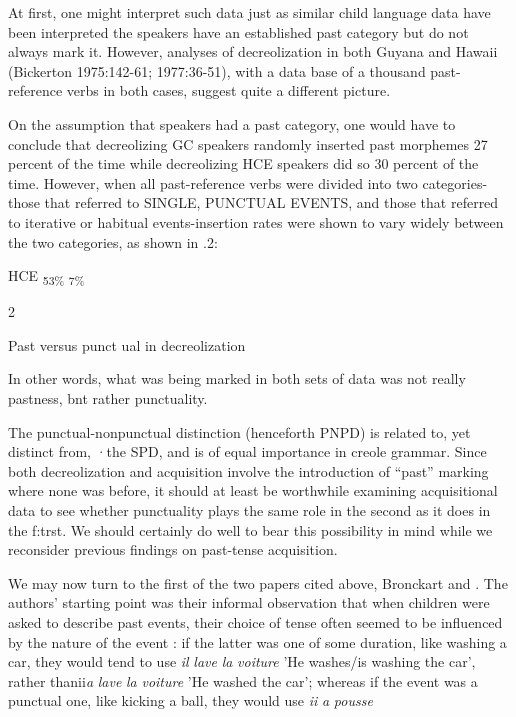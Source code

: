 At first, one might interpret such data just as similar child language data have been interpreted the speakers have an established past category but do not always mark it. However, analyses of de\-creolization in both Guyana and Hawaii (Bickerton 1975:142-61; 1977:36-51), with a data base of a thousand past-reference verbs in both cases, suggest quite a different picture.

On the assumption that speakers had a past category, one would have to conclude that decreolizing GC speakers randomly inserted past morphemes 27 percent of the time while decreolizing HCE speak\-ers did so 30 percent of the time. However, when all past-reference verbs were divided into two categories-those that referred to SINGLE, PUNCTUAL EVENTS, and those that referred to iterative or habitual events-insertion rates were shown to vary widely between the two categories, as shown in .2:



HCE \textsubscript{53\% }\textsubscript{7\%}

\begin{table}
\caption{2}
\label{tab:3}
\end{table}

Past versus punct ual in decreolization

In other words, what was being marked in both sets of data was not really pastness, bnt rather punctuality.

The punctual-nonpunctual distinction (henceforth PNPD) is related to, yet distinct from, ·the SPD, and is of equal importance in creole grammar. Since both decreolization and acquisition involve the introduction of ``past'' marking where none was before, it should at least be worthwhile examining acquisitional data to see whether punctuality plays the same role in the second as it does in the f:trst. We should certainly do well to bear this possibility in mind while we reconsider previous findings on past-tense acquisition.

We may now turn to the first of the two papers cited above, Bronckart and \citet{Sinclair1973}. The authors' starting point was their informal observation that when children were asked to describe past events, their choice of tense often seemed to be influenced by the nature of the event : if the latter was one of some duration, like washing a car, they would tend to use \textit{il} \textit{lave} \textit{la} \textit{voiture} 'He washes/is washing the car', rather thanii\textit{a} \textit{lave} \textit{la} \textit{voiture }'He washed the car'; whereas if the
event was a punctual one, like kicking a ball, they would use \textit{ii} \textit{a} \textit{pousse}

